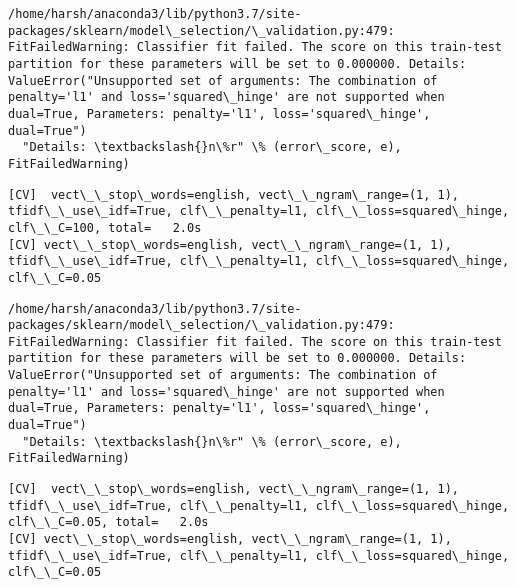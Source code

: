 \documentclass[11pt]{article}
\begin{document}
    \begin{Verbatim}[commandchars=\\\{\}]
/home/harsh/anaconda3/lib/python3.7/site-packages/sklearn/model\_selection/\_validation.py:479: FitFailedWarning: Classifier fit failed. The score on this train-test partition for these parameters will be set to 0.000000. Details: 
ValueError("Unsupported set of arguments: The combination of penalty='l1' and loss='squared\_hinge' are not supported when dual=True, Parameters: penalty='l1', loss='squared\_hinge', dual=True")
  "Details: \textbackslash{}n\%r" \% (error\_score, e), FitFailedWarning)

    \end{Verbatim}

    \begin{Verbatim}[commandchars=\\\{\}]
[CV]  vect\_\_stop\_words=english, vect\_\_ngram\_range=(1, 1), tfidf\_\_use\_idf=True, clf\_\_penalty=l1, clf\_\_loss=squared\_hinge, clf\_\_C=100, total=   2.0s
[CV] vect\_\_stop\_words=english, vect\_\_ngram\_range=(1, 1), tfidf\_\_use\_idf=True, clf\_\_penalty=l1, clf\_\_loss=squared\_hinge, clf\_\_C=0.05 

    \end{Verbatim}

    \begin{Verbatim}[commandchars=\\\{\}]
/home/harsh/anaconda3/lib/python3.7/site-packages/sklearn/model\_selection/\_validation.py:479: FitFailedWarning: Classifier fit failed. The score on this train-test partition for these parameters will be set to 0.000000. Details: 
ValueError("Unsupported set of arguments: The combination of penalty='l1' and loss='squared\_hinge' are not supported when dual=True, Parameters: penalty='l1', loss='squared\_hinge', dual=True")
  "Details: \textbackslash{}n\%r" \% (error\_score, e), FitFailedWarning)

    \end{Verbatim}

    \begin{Verbatim}[commandchars=\\\{\}]
[CV]  vect\_\_stop\_words=english, vect\_\_ngram\_range=(1, 1), tfidf\_\_use\_idf=True, clf\_\_penalty=l1, clf\_\_loss=squared\_hinge, clf\_\_C=0.05, total=   2.0s
[CV] vect\_\_stop\_words=english, vect\_\_ngram\_range=(1, 1), tfidf\_\_use\_idf=True, clf\_\_penalty=l1, clf\_\_loss=squared\_hinge, clf\_\_C=0.05 

    \end{Verbatim}
\end{document}
